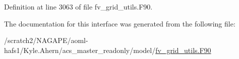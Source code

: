 Definition at line 3063 of file fv\-\_\-grid\-\_\-utils.\-F90.



The documentation for this interface was generated from the following file\-:\begin{DoxyCompactItemize}
\item 
/scratch2/\-N\-A\-G\-A\-P\-E/aoml-\/hafs1/\-Kyle.\-Ahern/acs\-\_\-master\-\_\-readonly/model/\hyperlink{fv__grid__utils_8F90}{fv\-\_\-grid\-\_\-utils.\-F90}\end{DoxyCompactItemize}
